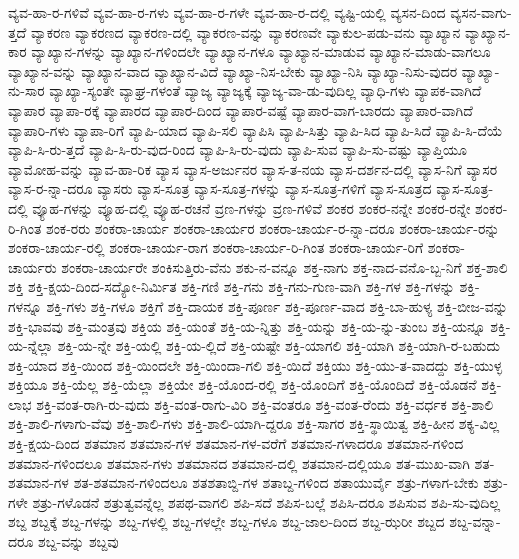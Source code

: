 {ವ್ಯವ-ಹಾ-ರ-ಗಳಿವೆ
ವ್ಯವ-ಹಾ-ರ-ಗಳು
ವ್ಯವ-ಹಾ-ರ-ಗಳೇ
ವ್ಯವ-ಹಾ-ರ-ದಲ್ಲಿ
ವ್ಯಷ್ಟಿ-ಯಲ್ಲಿ
ವ್ಯಸನ-ದಿಂದ
ವ್ಯಸನ-ವಾಗು-ತ್ತದೆ
ವ್ಯಾಕರಣ
ವ್ಯಾಕರಣದ
ವ್ಯಾಕರಣ-ದಲ್ಲಿ
ವ್ಯಾಕರಣ-ವನ್ನು
ವ್ಯಾಕರಣವೇ
ವ್ಯಾಕುಲ-ಪಡು-ವನು
ವ್ಯಾಖ್ಯಾನ
ವ್ಯಾಖ್ಯಾನ-ಕಾರ
ವ್ಯಾಖ್ಯಾನ-ಗಳನ್ನು
ವ್ಯಾಖ್ಯಾನ-ಗಳಿಂದಲೇ
ವ್ಯಾಖ್ಯಾನ-ಗಳೂ
ವ್ಯಾಖ್ಯಾನ-ಮಾಡುವ
ವ್ಯಾಖ್ಯಾನ-ಮಾಡು-ವಾಗಲೂ
ವ್ಯಾಖ್ಯಾನ-ವನ್ನು
ವ್ಯಾಖ್ಯಾನ-ವಾದ
ವ್ಯಾಖ್ಯಾನ-ವಿದೆ
ವ್ಯಾಖ್ಯಾ-ನಿಸ-ಬೇಕು
ವ್ಯಾಖ್ಯಾ-ನಿಸಿ
ವ್ಯಾಖ್ಯಾ-ನಿಸು-ವುದರ
ವ್ಯಾಖ್ಯಾ-ನು-ಸಾರ
ವ್ಯಾಖ್ಯಾ-ಸ್ಯಂತೇ
ವ್ಯಾಘ್ರ-ಗಳಂತೆ
ವ್ಯಾಜ್ಯ
ವ್ಯಾಜ್ಯಕ್ಕೆ
ವ್ಯಾಜ್ಯ-ವಾ-ಡು-ವುದಿಲ್ಲ
ವ್ಯಾಧಿ-ಗಳು
ವ್ಯಾಪಕ-ವಾಗಿದೆ
ವ್ಯಾಪಾರ
ವ್ಯಾಪಾ-ರಕ್ಕೆ
ವ್ಯಾಪಾರದ
ವ್ಯಾಪಾರ-ದಿಂದ
ವ್ಯಾಪಾರ-ವಷ್ಟೆ
ವ್ಯಾಪಾರ-ವಾಗ-ಬಾರದು
ವ್ಯಾಪಾರ-ವಾಗಿದೆ
ವ್ಯಾಪಾರಿ-ಗಳು
ವ್ಯಾಪಾ-ರಿಗೆ
ವ್ಯಾಪಿ-ಯಾದ
ವ್ಯಾಪಿ-ಸಲಿ
ವ್ಯಾಪಿಸಿ
ವ್ಯಾಪಿ-ಸಿತ್ತು
ವ್ಯಾಪಿ-ಸಿದ
ವ್ಯಾಪಿ-ಸಿದೆ
ವ್ಯಾಪಿ-ಸಿ-ದೆಯೆ
ವ್ಯಾಪಿ-ಸಿ-ರು-ತ್ತದೆ
ವ್ಯಾಪಿ-ಸಿ-ರು-ವುದ-ರಿಂದ
ವ್ಯಾಪಿ-ಸಿ-ರು-ವುದು
ವ್ಯಾಪಿ-ಸುವ
ವ್ಯಾಪಿ-ಸು-ವಷ್ಟು
ವ್ಯಾಪ್ತಿಯೂ
ವ್ಯಾಮೋಹ-ವನ್ನು
ವ್ಯಾವ-ಹಾ-ರಿಕ
ವ್ಯಾಸ
ವ್ಯಾಸ-ಅರ್ಜುನರ
ವ್ಯಾಸ-ತ-ನಯ
ವ್ಯಾಸ-ದರ್ಶನ-ದಲ್ಲಿ
ವ್ಯಾಸ-ನಿಗೆ
ವ್ಯಾಸರ
ವ್ಯಾಸ-ರ-ನ್ನಾ-ದರೂ
ವ್ಯಾಸರು
ವ್ಯಾಸ-ಸೂತ್ರ
ವ್ಯಾಸ-ಸೂತ್ರ-ಗಳನ್ನು
ವ್ಯಾಸ-ಸೂತ್ರ-ಗಳಿಗೆ
ವ್ಯಾಸ-ಸೂತ್ರದ
ವ್ಯಾಸ-ಸೂತ್ರ-ದಲ್ಲಿ
ವ್ಯೂಹ-ಗಳನ್ನು
ವ್ಯೂಹ-ದಲ್ಲಿ
ವ್ಯೂಹ-ರಚನೆ
ವ್ರಣ-ಗಳನ್ನು
ವ್ರಣ-ಗಳಿವೆ
ಶಂಕರ
ಶಂಕರ-ನನ್ನೇ
ಶಂಕರ-ರನ್ನೇ
ಶಂಕರ-ರಿ-ಗಿಂತ
ಶಂಕ-ರರು
ಶಂಕರಾ-ಚಾರ್ಯ
ಶಂಕರಾ-ಚಾರ್ಯರ
ಶಂಕರಾ-ಚಾರ್ಯ-ರ-ನ್ನಾ-ದರೂ
ಶಂಕರಾ-ಚಾರ್ಯ-ರನ್ನು
ಶಂಕರಾ-ಚಾರ್ಯ-ರಲ್ಲಿ
ಶಂಕರಾ-ಚಾರ್ಯ-ರಾಗ
ಶಂಕರಾ-ಚಾರ್ಯ-ರಿ-ಗಿಂತ
ಶಂಕರಾ-ಚಾರ್ಯ-ರಿಗೆ
ಶಂಕರಾ-ಚಾರ್ಯರು
ಶಂಕರಾ-ಚಾರ್ಯರೇ
ಶಂಕಿಸುತ್ತಿರು-ವೆನು
ಶಕು-ನ-ವನ್ನೂ
ಶಕ್ತ-ನಾಗು
ಶಕ್ತ-ನಾದ-ವನೊ-ಬ್ಬ-ನಿಗೆ
ಶಕ್ತ-ಶಾಲಿ
ಶಕ್ತಿ
ಶಕ್ತಿ-ಕ್ಷಯ-ದಿಂದ-ಸದ್ಯೋ-ನಿರ್ಮಿತ
ಶಕ್ತಿ-ಗಣಿ
ಶಕ್ತಿ-ಗನು
ಶಕ್ತಿ-ಗನು-ಗುಣ-ವಾಗಿ
ಶಕ್ತಿ-ಗಳ
ಶಕ್ತಿ-ಗಳನ್ನು
ಶಕ್ತಿ-ಗಳನ್ನೂ
ಶಕ್ತಿ-ಗಳು
ಶಕ್ತಿ-ಗಳೂ
ಶಕ್ತಿಗೆ
ಶಕ್ತಿ-ದಾಯಕ
ಶಕ್ತಿ-ಪೂರ್ಣ
ಶಕ್ತಿ-ಪೂರ್ಣ-ವಾದ
ಶಕ್ತಿ-ಬಾ-ಹುಳ್ಯ
ಶಕ್ತಿ-ಬೀಜ-ವನ್ನು
ಶಕ್ತಿ-ಭಾವವು
ಶಕ್ತಿ-ಮಂತ್ರವು
ಶಕ್ತಿಯ
ಶಕ್ತಿ-ಯಂತೆ
ಶಕ್ತಿ-ಯ-ನ್ನಿತ್ತು
ಶಕ್ತಿ-ಯನ್ನು
ಶಕ್ತಿ-ಯ-ನ್ನು-ತುಂಬ
ಶಕ್ತಿ-ಯನ್ನೂ
ಶಕ್ತಿ-ಯ-ನ್ನೆಲ್ಲಾ
ಶಕ್ತಿ-ಯ-ನ್ನೇ
ಶಕ್ತಿ-ಯಲ್ಲಿ
ಶಕ್ತಿ-ಯ-ಲ್ಲಿದೆ
ಶಕ್ತಿ-ಯಷ್ಟೇ
ಶಕ್ತಿ-ಯಾಗಲಿ
ಶಕ್ತಿ-ಯಾಗಿ
ಶಕ್ತಿ-ಯಾಗಿ-ರ-ಬಹುದು
ಶಕ್ತಿ-ಯಾದ
ಶಕ್ತಿ-ಯಿಂದ
ಶಕ್ತಿ-ಯಿಂದಲೇ
ಶಕ್ತಿ-ಯಿಂದಾ-ಗಲಿ
ಶಕ್ತಿ-ಯಿದೆ
ಶಕ್ತಿಯು
ಶಕ್ತಿ-ಯು-ತ-ವಾದದ್ದು
ಶಕ್ತಿ-ಯುಳ್ಳ
ಶಕ್ತಿಯೂ
ಶಕ್ತಿ-ಯೆಲ್ಲ
ಶಕ್ತಿ-ಯೆಲ್ಲಾ
ಶಕ್ತಿಯೇ
ಶಕ್ತಿ-ಯೊಂದ-ರಲ್ಲಿ
ಶಕ್ತಿ-ಯೊಂದಿಗೆ
ಶಕ್ತಿ-ಯೊಂದಿದೆ
ಶಕ್ತಿ-ಯೊಡನೆ
ಶಕ್ತಿ-ಲಾಭ
ಶಕ್ತಿ-ವಂತ-ರಾಗಿ-ರು-ವುದು
ಶಕ್ತಿ-ವಂತ-ರಾಗು-ವಿರಿ
ಶಕ್ತಿ-ವಂತರೂ
ಶಕ್ತಿ-ವಂತ-ರೆಂದು
ಶಕ್ತಿ-ವರ್ಧಕ
ಶಕ್ತಿ-ಶಾಲಿ
ಶಕ್ತಿ-ಶಾಲಿ-ಗಳಾಗು-ವೆವು
ಶಕ್ತಿ-ಶಾಲಿ-ಗಳು
ಶಕ್ತಿ-ಶಾಲಿ-ಯಾಗಿ-ದ್ದರೂ
ಶಕ್ತಿ-ಸಾಗರ
ಶಕ್ತಿ-ಸ್ಥಾಯಿತ್ವ
ಶಕ್ತಿ-ಹೀನ
ಶಕ್ಯ-ವಿಲ್ಲ
ಶಕ್ತಿ-ಕ್ಷಯ-ದಿಂದ
ಶತಮಾನ
ಶತಮಾನ-ಗಳ
ಶತಮಾನ-ಗಳ-ವರೆಗೆ
ಶತಮಾನ-ಗಳಾದರೂ
ಶತಮಾನ-ಗಳಿಂದ
ಶತಮಾನ-ಗಳಿಂದಲೂ
ಶತಮಾನ-ಗಳು
ಶತಮಾನದ
ಶತಮಾನ-ದಲ್ಲಿ
ಶತಮಾನ-ದಲ್ಲಿಯೂ
ಶತ-ಮುಖ-ವಾಗಿ
ಶತ-ಶತಮಾನ-ಗಳ
ಶತ-ಶತಮಾನ-ಗಳಿಂದಲೂ
ಶತಶತಾಬ್ದಿ-ಗಳ
ಶತಾಬ್ದ-ಗಳಿಂದ
ಶತಾಯುರ್ವೈ
ಶತ್ರು-ಗಳಾಗ-ಬೇಕು
ಶತ್ರು-ಗಳೇ
ಶತ್ರು-ಗಳೊಡನೆ
ಶತ್ರುತ್ವವನ್ನೆಲ್ಲ
ಶಪಥ-ವಾಗಲಿ
ಶಪಿ-ಸದೆ
ಶಪಿಸ-ಬಲ್ಲೆ
ಶಪಿಸಿ-ದರೂ
ಶಪಿಸುವ
ಶಪಿ-ಸು-ವುದಿಲ್ಲ
ಶಬ್ದ
ಶಬ್ದಕ್ಕೆ
ಶಬ್ದ-ಗಳನ್ನು
ಶಬ್ದ-ಗಳಲ್ಲಿ
ಶಬ್ದ-ಗಳಲ್ಲೇ
ಶಬ್ದ-ಗಳೂ
ಶಬ್ದ-ಜಾಲ-ದಿಂದ
ಶಬ್ದ-ಝರೀ
ಶಬ್ದದ
ಶಬ್ದ-ವನ್ನಾ-ದರೂ
ಶಬ್ದ-ವನ್ನು
ಶಬ್ದವು
}

